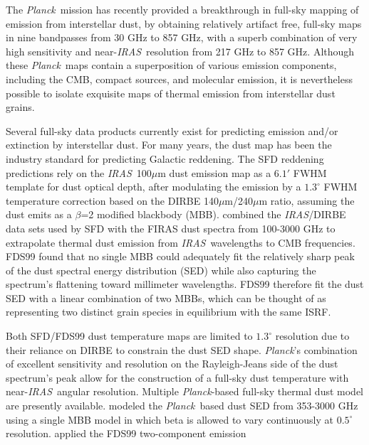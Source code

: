\documentclass{emulateapj}
\newcommand{\IRAS}{{\it IRAS}}
\newcommand{\PLANCK}{{\it Planck}}
\begin{document}
The \PLANCK~mission \citep{planck2013,planck2015} has recently provided a 
breakthrough in full-sky mapping of emission from interstellar dust, by 
obtaining relatively artifact free, full-sky maps in nine bandpasses from 30 
GHz to 857 GHz, with a superb combination of very high sensitivity and 
near-\IRAS~resolution from 217 GHz to 857 GHz. Although these \PLANCK~maps 
contain a superposition of various emission components, including the CMB, 
compact sources, and molecular emission, it is nevertheless possible to isolate
exquisite maps of thermal emission from interstellar dust grains.

Several full-sky data products currently exist for predicting emission and/or
extinction by interstellar dust. For many years, the 
\citet[hereafter SFD]{SFD} dust map has been the industry standard for 
predicting Galactic reddening. The SFD reddening predictions rely on the
\IRAS~100$\mu$m dust emission map as a $6.1'$ FWHM template for dust optical 
depth, after modulating the emission by a $1.3^{\circ}$ FWHM temperature 
correction based on the DIRBE 140$\mu$m/240$\mu$m ratio, assuming the dust
emits as a $\beta$=2 modified blackbody (MBB). \citet[henceforth FDS99]{FDS99} 
combined the \IRAS/DIRBE data sets used by SFD with the FIRAS \citep{firas} 
dust spectra from 100-3000 GHz to extrapolate thermal dust emission from 
\IRAS~wavelengths to CMB frequencies. FDS99 found that no single MBB could
adequately fit the relatively sharp peak of the dust spectral energy 
distribution (SED) while also capturing the spectrum's flattening toward
millimeter wavelengths. FDS99 therefore fit the dust SED with a linear 
combination of two MBBs, which can be thought of as representing two 
distinct grain species in equilibrium with the same ISRF.

Both SFD/FDS99 dust temperature maps are limited to $1.3^{\circ}$ resolution 
due to their reliance on DIRBE to constrain the dust SED shape. \PLANCK's 
combination of excellent sensitivity and resolution on the Rayleigh-Jeans
side of the dust spectrum's peak allow for the construction of a full-sky dust 
temperature with near-\IRAS~angular resolution. Multiple \PLANCK-based full-sky
thermal dust model are presently available. \cite{planckdust} modeled the
\PLANCK~based dust SED from 353-3000 GHz using a single MBB model in which
beta is allowed to vary continuously at $0.5^{\circ}$ resolution. 
\cite{meisner15} applied the FDS99 two-component emission 
\end{document}

